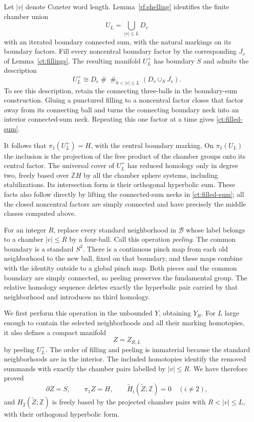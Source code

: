 \documentclass[11pt]{article}
\theoremstyle{definition}
\theoremstyle{remark}
\newcommand{\Z}{\mathbb Z}
\begin{document}
Let $|v|$ denote Coxeter word length.  Lemma~\ref{rf:shelling} identifies
the finite chamber union
\[
                  U_L=\bigcup_{|v|\leq L}D_v
\]
with an iterated boundary connected sum, with the natural markings on
its boundary factors.  Fill every noncentral boundary factor by the
corresponding $J_v$ of Lemma~\ref{ct:fillings}.  The resulting manifold
$U_L^+$ has boundary $S$ and admits the description
\begin{equation}\label{ct:filled-sum}
 U_L^+\cong D_e\mathbin{\#}
       \mathop{\#}_{0<|v|\leq L}(D_v\cup_S J_v).
\end{equation}
To see this description, retain the connecting three-balls in the
boundary-sum construction.  Gluing a punctured filling to a noncentral
factor closes that factor away from its connecting ball and turns the
connecting boundary neck into an interior connected-sum neck.  Repeating
this one factor at a time gives \eqref{ct:filled-sum}.

It follows that $\pi_1(U_L^+)=H$, with the central boundary marking.
On $\pi_1(U_L)$ the inclusion is the projection of the free product of
the chamber groups onto its central factor.  The universal cover of
$U_L^+$ has reduced homology only in degree two, freely based over
$\Z H$ by all the chamber sphere systems, including stabilizations.
Its intersection form is their orthogonal hyperbolic sum.  These facts
also follow directly by lifting the connected-sum necks in
\eqref{ct:filled-sum}; all the closed noncentral factors are simply
connected and have precisely the middle classes computed above.

For an integer $R$, replace every standard neighborhood in $\mathcal B$
whose label belongs to a chamber $|v|\leq R$ by a four-ball.  Call this
operation \emph{peeling}.  The common boundary is a standard $S^3$.
There is a continuous pinch map from each old neighborhood to the new
ball, fixed on that boundary, and these maps combine with the identity
outside to a global pinch map.  Both pieces and the common boundary are
simply connected, so peeling preserves the fundamental group.  The
relative homology sequence deletes exactly the hyperbolic pair carried
by that neighborhood and introduces no third homology.

We first perform this operation in the unbounded $Y$, obtaining $Y_R$.
For $L$ large enough to contain the selected neighborhoods and all their
marking homotopies, it also defines a compact manifold
\[
                        Z=Z_{R,L}
\]
by peeling $U_L^+$.  The order of filling and peeling is immaterial
because the standard neighborhoods are in the interior.  The included
homotopies identify the removed summands with exactly the chamber pairs
labelled by $|v|\leq R$.  We have therefore proved
\begin{equation}\label{ct:Z-homology}
 \partial Z=S,\qquad \pi_1 Z=H,\qquad
 \widetilde H_i(\widetilde Z;\Z)=0\quad(i\ne2),
\end{equation}
and $H_2(\widetilde Z;\Z)$ is freely based by the projected chamber
pairs with $R<|v|\leq L$, with their orthogonal hyperbolic form.
\end{document}
